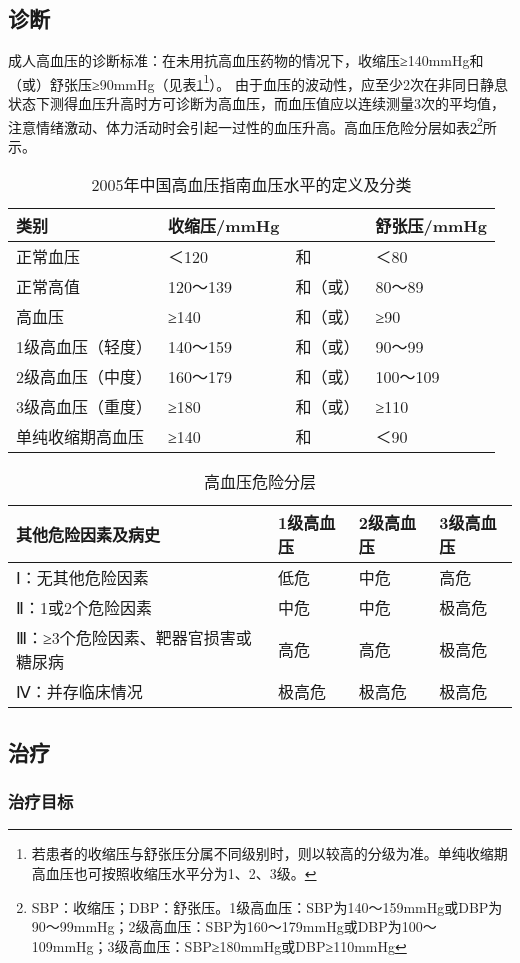 \subsection{诊断}

成人高血压的诊断标准：在未用抗高血压药物的情况下，收缩压≥140mmHg和（或）舒张压≥90mmHg（见表\ref{tab11-1}\footnote{若患者的收缩压与舒张压分属不同级别时，则以较高的分级为准。单纯收缩期高血压也可按照收缩压水平分为1、2、3级。}）。
由于血压的波动性，应至少2次在非同日静息状态下测得血压升高时方可诊断为高血压，而血压值应以连续测量3次的平均值，注意情绪激动、体力活动时会引起一过性的血压升高。高血压危险分层如表\ref{tab11-2}\footnote{SBP：收缩压；DBP：舒张压。1级高血压：SBP为140～159mmHg或DBP为90～99mmHg；2级高血压：SBP为160～179mmHg或DBP为100～109mmHg；3级高血压：SBP≥180mmHg或DBP≥110mmHg}所示。

\begin{longtable}{llll}
\caption{2005年中国高血压指南血压水平的定义及分类}
\label{tab11-1}\\
\toprule
类别&收缩压/mmHg&&舒张压/mmHg\\
\midrule
正常血压&＜120&和&＜80\\
正常高值&120～139&和（或）&80～89\\
高血压&≥140&和（或）&≥90\\
\quad 1级高血压（轻度）&140～159&和（或）&90～99\\
2级高血压（中度）&160～179&和（或）&100～109\\
3级高血压（重度）&≥180&和（或）&≥110\\
单纯收缩期高血压&≥140&和&＜90\\
\bottomrule
\end{longtable}

\begin{longtable}[]{@{}llll@{}}
\caption{高血压危险分层}
\label{tab11-2}\\
\toprule
\endhead
其他危险因素及病史 & 1级高血压 & 2级高血压 & 3级高血压\tabularnewline
\midrule
Ⅰ：无其他危险因素 & 低危 & 中危 & 高危\tabularnewline
Ⅱ：1或2个危险因素 & 中危 & 中危 & 极高危\tabularnewline
Ⅲ：≥3个危险因素、靶器官损害或糖尿病 & 高危 & 高危 &
极高危\tabularnewline
Ⅳ：并存临床情况 & 极高危 & 极高危 & 极高危\tabularnewline
\bottomrule
\end{longtable}

\subsection{治疗}

\subsubsection{治疗目标}

